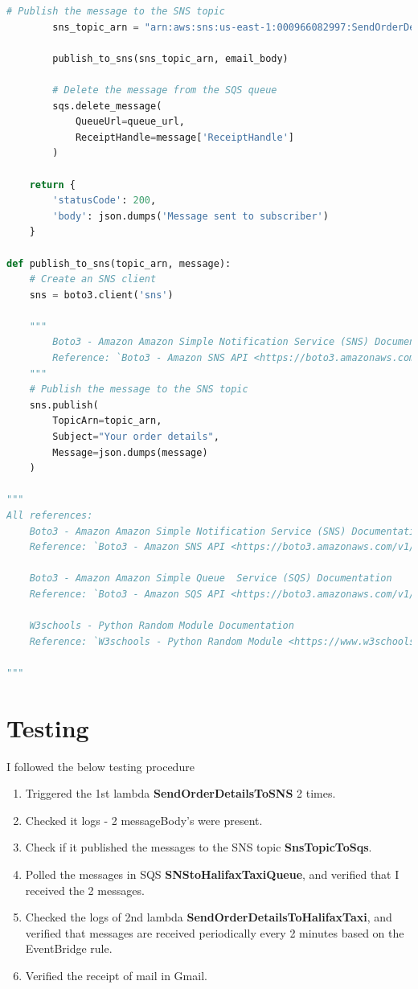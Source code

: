 \begin{enumerate}
\begin{mdframed}[linewidth=1pt]
\begin{lstlisting}[language=Python]
        # Publish the message to the SNS topic
        sns_topic_arn = "arn:aws:sns:us-east-1:000966082997:SendOrderDetailsToEmail"
        
        publish_to_sns(sns_topic_arn, email_body)

        # Delete the message from the SQS queue
        sqs.delete_message(
            QueueUrl=queue_url,
            ReceiptHandle=message['ReceiptHandle']
        )

    return {
        'statusCode': 200,
        'body': json.dumps('Message sent to subscriber')
    }

def publish_to_sns(topic_arn, message):
    # Create an SNS client
    sns = boto3.client('sns')

    """
        Boto3 - Amazon Amazon Simple Notification Service (SNS) Documentation
        Reference: `Boto3 - Amazon SNS API <https://boto3.amazonaws.com/v1/documentation/api/latest/reference/services/sns.html>`_
    """
    # Publish the message to the SNS topic
    sns.publish(
        TopicArn=topic_arn,
        Subject="Your order details",
        Message=json.dumps(message)
    )

"""
All references:
    Boto3 - Amazon Amazon Simple Notification Service (SNS) Documentation
    Reference: `Boto3 - Amazon SNS API <https://boto3.amazonaws.com/v1/documentation/api/latest/reference/services/sns.html>`_

    Boto3 - Amazon Amazon Simple Queue  Service (SQS) Documentation
    Reference: `Boto3 - Amazon SQS API <https://boto3.amazonaws.com/v1/documentation/api/latest/reference/services/sqs.html>`_

    W3schools - Python Random Module Documentation
    Reference: `W3schools - Python Random Module <https://www.w3schools.com/python/module_random.asp>`_
    
"""
\end{lstlisting}
\end{mdframed}
\section{Testing}
I followed the below testing procedure
\begin{enumerate}
    \item Triggered the 1st lambda \textbf{SendOrderDetailsToSNS} 2 times.
    \item Checked it logs - 2 messageBody's were present.
    \item Check if it published the messages to the SNS topic \textbf{SnsTopicToSqs}.
    \item Polled the messages in SQS \textbf{SNStoHalifaxTaxiQueue}, and verified that I received the 2 messages.
    \item Checked the logs of 2nd lambda \textbf{SendOrderDetailsToHalifaxTaxi}, and verified that messages are received periodically every 2 minutes based on the EventBridge rule.
    \item Verified the receipt of mail in Gmail.
\end{enumerate}

\end{enumerate}


